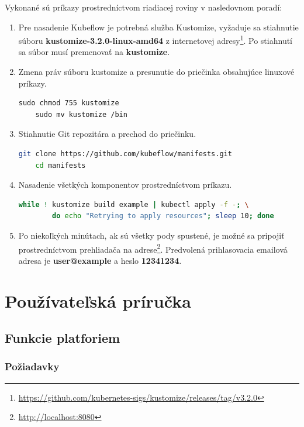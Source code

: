 Vykonané sú príkazy prostredníctvom riadiacej roviny v nasledovnom poradí:

\begin{enumerate}
\item{\noindent Pre nasadenie Kubeflow je potrebná služba Kustomize, vyžaduje sa stiahnutie súboru \textbf{kustomize-3.2.0-linux-amd64} z internetovej adresy\footnote{\url{https://github.com/kubernetes-sigs/kustomize/releases/tag/v3.2.0}}. Po stiahnutí sa súbor musí premenovať na \textbf{kustomize}}.
\item{\noindent Zmena práv súboru kustomize a presunutie do priečinka obsahujúce linuxové príkazy.
\begin{lstlisting}[basicstyle=\footnotesize]
    sudo chmod 755 kustomize
    sudo mv kustomize /bin
    \end{lstlisting}}
\item{\noindent Stiahnutie Git repozitára a prechod do priečinku.
\begin{lstlisting}[language=Bash,basicstyle=\footnotesize]
    git clone https://github.com/kubeflow/manifests.git
    cd manifests
    \end{lstlisting}}
\item{\noindent Nasadenie všetkých komponentov prostredníctvom príkazu.
\begin{lstlisting}[language=Bash,basicstyle=\footnotesize]
    while ! kustomize build example | kubectl apply -f -; \
        do echo "Retrying to apply resources"; sleep 10; done
    \end{lstlisting}}
\item{\noindent Po niekoľkých minútach, ak sú všetky pody spustené, je možné sa pripojiť prostredníctvom prehliadača na adrese\footnote{\url{http://localhost:8080}}. Predvolená prihlasovacia emailová adresa je \textbf{user@example} a heslo \textbf{12341234}.}
\end{enumerate}

\chapter{Používateľská príručka}

\section{Funkcie platforiem}
\subsection*{Požiadavky}

